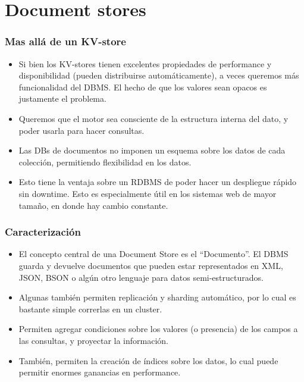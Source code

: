 \section{Document stores}

\begin{frame}
\frametitle{Mas allá de un KV-store}
\begin{itemize}

\item	Si bien los KV-stores tienen excelentes propiedades de performance
	y disponibilidad (pueden distribuirse automáticamente), a veces
	queremos más funcionalidad del DBMS. El hecho de que los valores
	sean opacos es justamente el problema.
	\pause

\item	Queremos que el motor sea consciente de la estructura interna
	del dato, y poder usarla para hacer consultas.
	\pause

\item	Las DBs de documentos no imponen un esquema sobre los datos de
	cada colección, permitiendo flexibilidad en los datos.
	\pause

\item	Esto tiene la ventaja sobre un RDBMS de poder hacer un despliegue
	rápido sin downtime. Esto es especialmente útil en los sistemas
	web de mayor tamaño, en donde hay cambio constante.
\end{itemize}
\end{frame}

\begin{frame}
\frametitle{Caracterización}
\begin{itemize}
\item	El concepto central de una Document Store es el ``Documento''.
	El DBMS guarda y devuelve documentos que pueden estar representados
	en XML, JSON, BSON o algún otro lenguaje para datos semi-estructurados.
	\pause

\item	Algunas también permiten replicación y sharding automático, por lo
	cual es bastante simple correrlas en un cluster.
	\pause

\item	Permiten agregar condiciones sobre los valores (o presencia) de los
	campos a las consultas, y proyectar la información.
	\pause

\item	También, permiten la creación de índices sobre los datos, lo cual
	puede permitir enormes ganancias en performance.
\end{itemize}
\end{frame}
